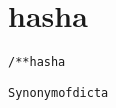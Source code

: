 \section{hasha}
\begin{shaded}
\begin{alltt}
/** hasha

  Synonym of dicta

\end{alltt}
\end{shaded}
